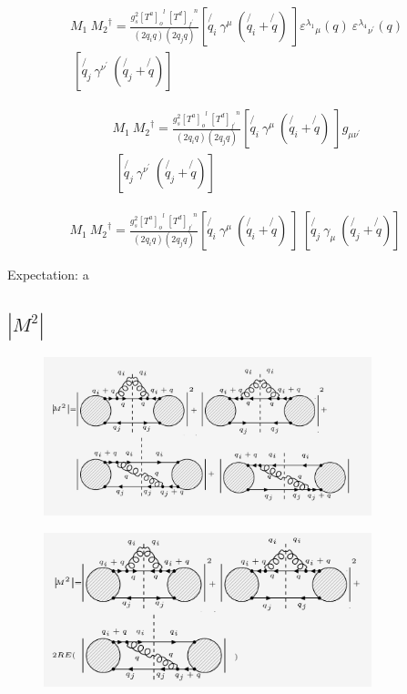 \begin{equation}
\begin{split}
M_1\: {M_2}^{\dagger} = \frac{g_s^2 {[T^a]_o}^l \:{[T^d]_{f^{\prime}}}^n }{(2q_i q)(2q_j q)} [\not{q_i}\: \gamma^{\mu} \: (\not{q_i} + \not{q})\: ]{\varepsilon^{\lambda_1}}_{\mu} (q) \: {\varepsilon^{\lambda_4}}_{{\nu}^{\prime}} (q) \\
\:[\not{q_j} \:\gamma^{{\nu}^{\prime}} \: (\not{q_j} + \not{q})]\:
\end{split}
\end{equation}

\begin{equation}
\begin{split}
M_1\: {M_2}^{\dagger} = \frac{g_s^2 {[T^a]_o}^l \:{[T^d]_{f^{\prime}}}^n }{(2q_i q)(2q_j q)} [\not{q_i}\: \gamma^{\mu} \: (\not{q_i} + \not{q})\: ] g_{{\mu}{{\nu}^{\prime}}} \\
\:[\not{q_j} \:\gamma^{{\nu}^{\prime}} \: (\not{q_j} + \not{q})]\:
\end{split}
\end{equation}



\begin{equation}
\begin{split}
M_1\: {M_2}^{\dagger} = \frac{g_s^2 {[T^a]_o}^l \:{[T^d]_{f^{\prime}}}^n }{(2q_i q)(2q_j q)} [\not{q_i}\: \gamma^{\mu} \: (\not{q_i} + \not{q})\: ]
\:[\not{q_j} \:\gamma_{\mu} \: (\not{q_j} + \not{q})]\:
\end{split}
\end{equation}

Expectation:
a


\subsection{$|M^{2}|$}

\begin{figure}[h!]
\centering
\includegraphics[width=0.85\textwidth]{images/qqgMSquer.png}
\end{figure}

\begin{figure}[h!]
\centering
\includegraphics[width=0.85\textwidth]{images/REqqgMSquer.png}
\end{figure}

\newpage
